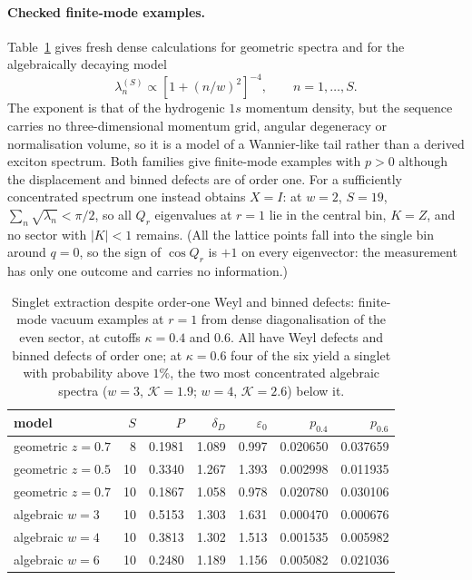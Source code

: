 \documentclass[11pt,a4paper]{article}
\begin{document}
\paragraph{Checked finite-mode examples.}
Table~\ref{tab:dense} gives fresh dense calculations for geometric spectra and for the algebraically decaying model
\begin{equation}
\lambda_n^{(S)}\propto[1+(n/w)^2]^{-4},\qquad n=1,\ldots,S.
\label{eq:algebraic}
\end{equation}
The exponent is that of the hydrogenic $1s$ momentum density, but the sequence carries no three-dimensional momentum grid, angular degeneracy or normalisation volume, so it is a model of a Wannier-like tail rather than a derived exciton spectrum. Both families give finite-mode examples with $p>0$ although the displacement and binned defects are of order one. For a sufficiently concentrated spectrum one instead obtains $X=I$: at $w=2$, $S=19$, $\sum_n\sqrt{\lambda_n}<\pi/2$, so all $Q_r$ eigenvalues at $r=1$ lie in the central bin, $K=Z$, and no sector with $|K|<1$ remains. (All the lattice points fall into the single bin around $q=0$, so the sign of $\cos Q_r$ is $+1$ on every eigenvector: the measurement has only one outcome and carries no information.)

\begin{table}[t]
\centering\small
\begin{tabular}{lrrrrrr}
\toprule
model & $S$ & $P$ & $\delta_D$ & $\varepsilon_0$ & $p_{0.4}$ & $p_{0.6}$\\
\midrule
geometric $z=0.7$ & 8 & 0.1981 & 1.089 & 0.997 & 0.020650 & 0.037659\\
geometric $z=0.5$ & 10 & 0.3340 & 1.267 & 1.393 & 0.002998 & 0.011935\\
geometric $z=0.7$ & 10 & 0.1867 & 1.058 & 0.978 & 0.020780 & 0.030106\\
algebraic $w=3$ & 10 & 0.5153 & 1.303 & 1.631 & 0.000470 & 0.000676\\
algebraic $w=4$ & 10 & 0.3813 & 1.302 & 1.513 & 0.001535 & 0.005982\\
algebraic $w=6$ & 10 & 0.2480 & 1.189 & 1.156 & 0.005082 & 0.021036\\
\bottomrule
\end{tabular}
\caption{Singlet extraction despite order-one Weyl and binned defects: finite-mode vacuum examples at $r=1$ from dense diagonalisation of the even sector, at cutoffs $\kappa=0.4$ and $0.6$. All have Weyl defects and binned defects of order one; at $\kappa=0.6$ four of the six yield a singlet with probability above $1\%$, the two most concentrated algebraic spectra ($w=3$, $\mathcal K=1.9$; $w=4$, $\mathcal K=2.6$) below it.}
\label{tab:dense}
\end{table}
\end{document}

